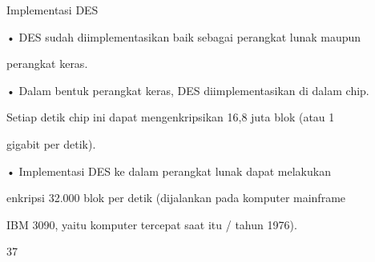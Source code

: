 \documentclass{article}
\begin{document}

Implementasi DES

• DES sudah diimplementasikan baik sebagai perangkat lunak maupun 

perangkat keras.

• Dalam bentuk perangkat keras, DES diimplementasikan di dalam chip. 

Setiap detik chip ini dapat mengenkripsikan 16,8 juta blok (atau 1 

gigabit per detik).

• Implementasi DES ke dalam perangkat lunak dapat melakukan 

enkripsi 32.000 blok per detik (dijalankan pada komputer mainframe 

IBM 3090, yaitu komputer tercepat saat itu / tahun 1976).

37
\end{document}
